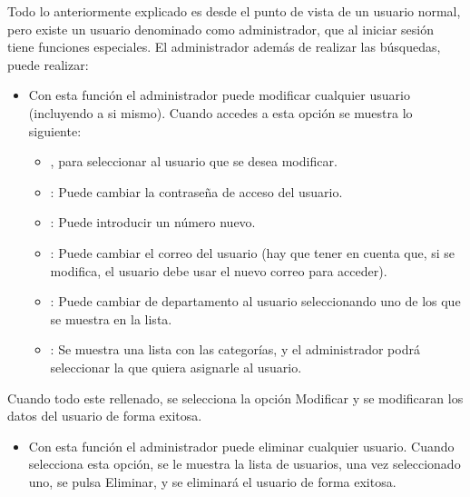 \documentclass[letterpaper,10pt,spanish]{sphinxmanual}
\begin{document}
\sphinxAtStartPar
Todo lo anteriormente explicado es desde el punto de vista de un usuario normal, pero existe un usuario denominado como administrador,
que al iniciar sesión tiene funciones especiales. El administrador además de realizar las búsquedas, puede realizar:
\begin{itemize}
\item {} 
\sphinxAtStartPar
{} Con esta función el administrador puede modificar cualquier usuario (incluyendo a si mismo). Cuando accedes a esta opción se muestra lo siguiente:
\begin{itemize}
\item {} 
\sphinxAtStartPar
{}, para seleccionar al usuario que se desea modificar.

\item {} 
\sphinxAtStartPar
{}: Puede cambiar la contraseña de acceso del usuario.

\item {} 
\sphinxAtStartPar
{}: Puede introducir un número nuevo.

\item {} 
\sphinxAtStartPar
{}: Puede cambiar el correo del usuario (hay que tener en cuenta que, si se modifica, el usuario debe usar el nuevo correo para acceder).

\item {} 
\sphinxAtStartPar
{}: Puede cambiar de departamento al usuario seleccionando uno de los que se muestra en la lista.

\item {} 
\sphinxAtStartPar
{}: Se muestra una lista con las categorías, y el administrador podrá seleccionar la que quiera asignarle al usuario.

\end{itemize}

\end{itemize}

\sphinxAtStartPar
Cuando todo este rellenado, se selecciona la opción Modificar y se modificaran los datos del usuario de forma exitosa.
\begin{itemize}
\item {} 
\sphinxAtStartPar
{} Con esta función el administrador puede eliminar cualquier usuario. Cuando selecciona esta opción, se le muestra la lista de usuarios, una vez seleccionado uno, se pulsa Eliminar, y se eliminará el usuario de forma exitosa.

\end{itemize}
\end{document}

